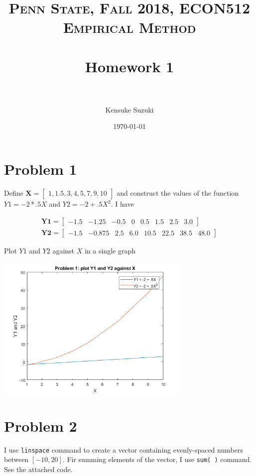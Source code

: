 \documentclass[11pt,letter]{article}
\title{	
\normalfont \normalsize 
\textsc{Penn State, Fall 2018, ECON512 Empirical Method} \\ [25pt] %
\horrule{0.5pt} \\[0.4cm] %
\huge Homework 1 \\ %
\horrule{2pt} \\[0.5cm] %
}
\author{Kensuke Suzuki} %
\date{\normalsize\today} %
\newcommand{\vect}[1]{\boldsymbol{\mathbf{#1}}}
\newcounter{lem}[section] \setcounter{lem}{0}
\newcommand{\bmat}[1]{\begin{bmatrix} #1 \end{bmatrix}}%
\newcommand{\code}[1]{\texttt{#1}}
\begin{document}
\maketitle %

\section*{Problem 1}
Define $\vect{X} = \bmat{1,1.5,3,4,5,7,9,10}$ and construct the values of the function $Y1=-2*.5X$ and $Y2 = -2 + .5X^2$. I have

\begin{align*}
\vect{Y1} = \left[\begin{array}{cccccccc} -1.5 & -1.25 & -0.5 & 0 & 0.5 & 1.5 & 2.5 & 3.0 \end{array}\right]\\
\vect{Y2} = \left[\begin{array}{cccccccc} -1.5 & -0.875 & 2.5 & 6.0 & 10.5 & 22.5 & 38.5 & 48.0 \end{array}\right]
\end{align*}

Plot $Y1$ and $Y2$ against $X$ in a single graph

\begin{center}
\includegraphics[width=0.7\textwidth]{Problem1.png} 
\end{center}

\section*{Problem 2}
I use \code{linspace} command to create a vector containing evenly-spaced numbers between $[-10,20]$. Fir summing elements of the vector, I use \code{sum( )} command. See the attached code.


\end{document}
